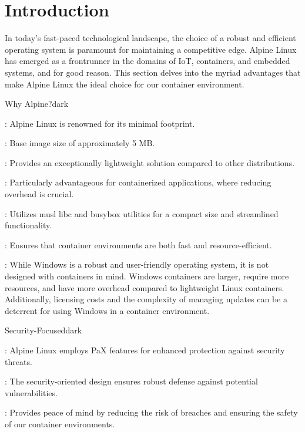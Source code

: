 \section{Introduction}
In today's fast-paced technological landscape, the choice of a robust and efficient operating system is paramount for maintaining a competitive edge.
Alpine Linux has emerged as a frontrunner in the domains of IoT, containers, and embedded systems, and for good reason.
This section delves into the myriad advantages that make Alpine Linux the ideal choice for our container environment.
\bigskip
{}
\label{Why Alpine?}
\begin{baseBoxThree}{Why Alpine?}{dark}
    \bigskip
    \begin{posnexItemize}
        \item[\sA] : Alpine Linux is renowned for its minimal footprint.
        \item[\sA] : Base image size of approximately 5 MB.
        \item[\sA] : Provides an exceptionally lightweight solution compared to other distributions.
        \item[\sA] : Particularly advantageous for containerized applications, where reducing overhead is crucial.
        \item[\sA] : Utilizes musl libc and busybox utilities for a compact size and streamlined functionality.
        \item[\sA] : Ensures that container environments are both fast and resource-efficient.
        \item[\sA] : While Windows is a robust and user-friendly operating system, it is not designed with containers in mind. Windows containers are larger, require more resources, and have more overhead compared to lightweight Linux containers. Additionally, licensing costs and the complexity of managing updates can be a deterrent for using Windows in a container environment.
    \end{posnexItemize}
    \smallskip
\end{baseBoxThree}

\label{Security-Focused}
\begin{baseBoxThree}{Security-Focused}{dark}
    \begin{posnexItemize}
        \item[\sA] : Alpine Linux employs PaX features for enhanced protection against security threats.
        \item[\sA] : The security-oriented design ensures robust defense against potential vulnerabilities.
        \item[\sA] : Provides peace of mind by reducing the risk of breaches and ensuring the safety of our container environments.
    \end{posnexItemize}
\end{baseBoxThree}

